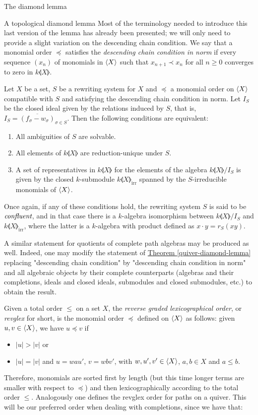 \begin{chapter}{The diamond lemma}
\begin{section}{A topological diamond lemma}
Most of the terminology needed to introduce this last version of the lemma has already been presented; we will only need to provide a slight variation on the descending chain condition. We say that a monomial order $\preceq$ satisfies the \emph{descending chain condition in norm} if every sequence $(x_n)$ of monomials in $\langle X\rangle$ such that $x_{n+1}\prec x_n$ for all $n\geq 0$ converges to zero in $k\llangle X\rrangle$.

\begin{thm} Let $X$ be a set, $S$ be a rewriting system for $X$ and $\preceq$ a monomial order on $\langle X\rangle$ compatible with $S$ and satisfying the descending chain condition in norm. Let $I_S$ be the closed ideal given by the relations induced by $S$, that is, $I_S=\overline{(f_\sigma-w_\sigma)}_{\sigma\in S}$. Then the following conditions are equivalent:
\begin{enumerate}
\item All ambiguities of $S$ are solvable.
\item All elements of $k\llangle X\rrangle$ are reduction-unique under $S$.
\item A set of representatives in $k\llangle X\rrangle$ for the elements of the algebra $k\llangle X\rrangle/I_S$ is given by the closed $k$-submodule $k\llangle X\rrangle_{\mathrm{irr}}$ spanned by the $S$-irreducible monomials of $\langle X\rangle$.
\end{enumerate}
Once again, if any of these conditions hold, the rewriting system $S$ is said to be $\emph{confluent}$, and in that case  there is a $k$-algebra isomorphism between $k\llangle X\rrangle/I_S$ and $k\llangle X\rrangle_{\mathrm{irr}}$, where the latter is a $k$-algebra with product defined as $x\cdot y= r_S(xy)$.
\end{thm}

A similar statement for quotients of complete path algebras may be produced as well. Indeed, one may modify the statement of \hyperref[quiver-diamond-lemma]{Theorem \ref*{quiver-diamond-lemma}} replacing "descending chain condition" by "descending chain condition in norm" and all algebraic objects by their complete counterparts (algebras and their completions, ideals and closed ideals, submodules and closed submodules, etc.) to obtain the result.

Given a total order $\leq$ on a set $X$, the \emph{reverse graded lexicographical order}, or \emph{revglex} for short, is the monomial order $\preceq$ defined on $\langle X\rangle$ as follows: given $u,v\in \langle X\rangle$, we have $u\preceq v$ if
\begin{itemize}
\item $|u| > |v|$ or
\item $|u| = |v|$ and $u=wau'$, $v=wbv'$, with $w,u',v'\in \langle X\rangle$, $a,b\in X$ and $a\leq b$.
\end{itemize}
Therefore, monomials are sorted first by length (but this time longer terms are smaller with respect to $\preceq$) and then lexicographically according to the total order $\leq$. Analogously one defines the revglex order for paths on a quiver. This will be our preferred order when dealing with completions, since we have that:


\end{section}
\end{chapter}
